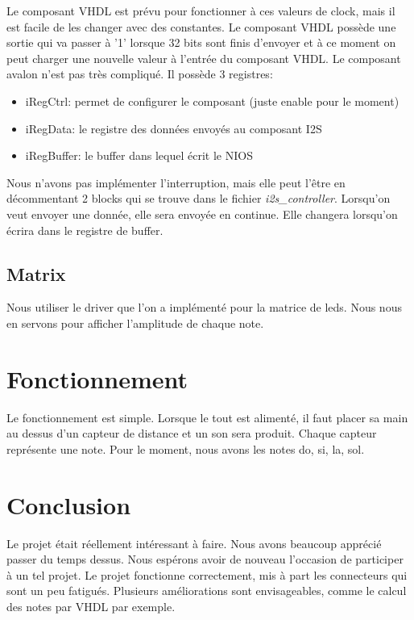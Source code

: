 \documentclass[a4paper]{article}
\begin{document}
Le composant VHDL est prévu pour fonctionner à ces valeurs de clock, mais il est facile
de les changer avec des constantes. Le composant VHDL possède une sortie qui va passer à '1'
lorsque 32 bits sont finis d'envoyer et à ce moment on peut charger une nouvelle valeur
à l'entrée du composant VHDL. Le composant avalon n'est pas très compliqué. Il possède 3 registres:

\begin{itemize}
  \item iRegCtrl: permet de configurer le composant (juste enable pour le moment)
  \item iRegData: le registre des données envoyés au composant I2S
  \item iRegBuffer: le buffer dans lequel écrit le NIOS
\end{itemize}

Nous n'avons pas implémenter l'interruption, mais elle peut l'être en décommentant
2 blocks qui se trouve dans le fichier \textit{i2s\_controller}. Lorsqu'on veut envoyer
une donnée, elle sera envoyée en continue. Elle changera lorsqu'on écrira dans le registre
de buffer.

\subsection{Matrix}
Nous utiliser le driver que l'on a implémenté pour la matrice de leds. Nous nous en servons
pour afficher l'amplitude de chaque note.

\newpage

\section{Fonctionnement}
Le fonctionnement est simple. Lorsque le tout est alimenté, il faut placer sa main au dessus
d'un capteur de distance et un son sera produit. Chaque capteur représente une note.
Pour le moment, nous avons les notes do, si, la, sol.

\section{Conclusion}
Le projet était réellement intéressant à faire. Nous avons beaucoup apprécié passer du temps
dessus. Nous espérons avoir de nouveau l'occasion de participer à un tel projet. Le
projet fonctionne correctement, mis à part les connecteurs qui sont un peu fatigués. Plusieurs
améliorations sont envisageables, comme le calcul des notes par VHDL par exemple.
\end{document}
